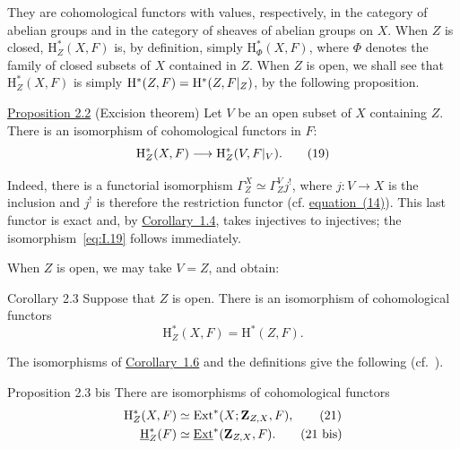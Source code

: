 They are cohomological functors with values, respectively, in the category
of abelian groups and in the category of sheaves of abelian groups on $X$.
When $Z$ is closed, $\mathrm H_Z^*(X,F)$ is, by definition, simply
$\mathrm H_\Phi^*(X,F)$, where $\Phi$ denotes the family of closed subsets
of $X$ contained in $Z$. When $Z$ is open, we shall see that
$\mathrm H_Z^*(X,F)$ is simply
$\mathrm H^*(Z,F)=\mathrm H^*(Z,F\vert_{Z})$, by the following
proposition.

\begin{sgastatement}{\hyperref[I.2.2]{Proposition 2.2} (Excision theorem)}
Let $V$ be an open subset of $X$ containing $Z$. There is an isomorphism of
cohomological functors in $F$:
\begin{equation}
  \mathrm H_Z^*(X,F)
  \longrightarrow
  \mathrm H_Z^*(V,F\vert_{V}).
  \tag{19}\label{eq:I.19}
\end{equation}
\end{sgastatement}

Indeed, there is a functorial isomorphism
$\Gamma_Z^X\simeq\Gamma_Z^Vj^!$, where $j\colon V\to X$ is the inclusion
and $j^!$ is therefore the restriction functor (cf. \hyperref[eq:I.14]{equation~(14)}). This
last functor is exact and, by \hyperref[I.1.4]{Corollary~1.4}, takes injectives to injectives;
the isomorphism~\eqref{eq:I.19} follows immediately.

When $Z$ is open, we may take $V=Z$, and obtain:

\begin{sgastatement}{Corollary 2.3}
Suppose that $Z$ is open. There is an isomorphism of cohomological functors
\begin{equation}
  \mathrm H_Z^*(X,F)=\mathrm H^*(Z,F).
  \tag{20}\label{eq:I.20}
\end{equation}
\end{sgastatement}

The isomorphisms of \hyperref[I.1.6]{Corollary~1.6} and the definitions give the following
(cf.\ \cite{Tohoku}).

\begin{sgastatement}{Proposition 2.3 bis}
There are isomorphisms of cohomological functors
\begin{align}
  \mathrm H_Z^*(X,F)
    &\simeq \operatorname{Ext}^*(X;\mathbf Z_{Z,X},F),
    \tag{21}\label{eq:I.21}\\
  \mathop{\underline{\mathrm H}}\nolimits_Z^*(F)
    &\simeq \mathop{\underline{\mathrm{Ext}}}\nolimits^*(\mathbf Z_{Z,X},F).
    \tag{21 bis}\label{eq:I.21bis}
\end{align}
\end{sgastatement}

